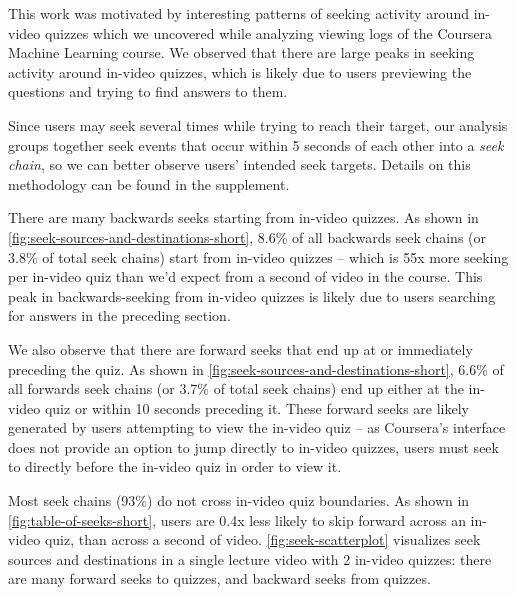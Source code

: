 \documentclass{sigchi}
\begin{document}
This work was motivated by interesting patterns of seeking activity around in-video quizzes which we uncovered while analyzing viewing logs of the Coursera Machine Learning course. We observed that there are large peaks in seeking activity around in-video quizzes, which is likely due to users previewing the questions and trying to find answers to them. 


Since users may seek several times while trying to reach their target, our analysis groups together seek events that occur within 5 seconds of each other into a \textit{seek chain}, so we can better observe users' intended seek targets. Details on this methodology can be found in the supplement.


There are many backwards seeks starting from in-video quizzes. As shown in \autoref{fig:seek-sources-and-destinations-short}, 8.6\% of all backwards seek chains (or 3.8\% of total seek chains) start from in-video quizzes -- which is 55x more seeking per in-video quiz than we'd expect from a second of video in the course. This peak in backwards-seeking from in-video quizzes is likely due to users searching for answers in the preceding section.

We also observe that there are forward seeks that end up at or immediately preceding the quiz. As shown in \autoref{fig:seek-sources-and-destinations-short}, 6.6\% of all forwards seek chains (or 3.7\% of total seek chains) end up either at the in-video quiz or within 10 seconds preceding it. These forward seeks are likely generated by users attempting to view the in-video quiz -- as Coursera's interface does not provide an option to jump directly to in-video quizzes, users must seek to directly before the in-video quiz in order to view it.

Most seek chains (93\%) do not cross in-video quiz boundaries. As shown in \autoref{fig:table-of-seeks-short}, users are 0.4x less likely to skip forward across an in-video quiz, than across a second of video. \autoref{fig:seek-scatterplot} visualizes seek sources and destinations in a single lecture video with 2 in-video quizzes: there are many forward seeks to quizzes, and backward seeks from quizzes.
\end{document}
